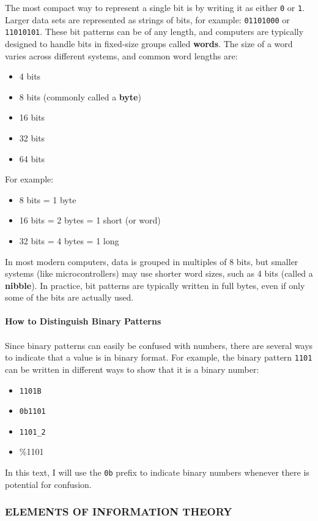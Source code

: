 \documentclass[12pt, oneside]{book}
\begin{document}
The most compact way to represent a single bit is by writing it as either \texttt{0} or \texttt{1}. Larger data sets are represented as strings of bits, for example: \texttt{01101000} or \texttt{11010101}. These bit patterns can be of any length, and computers are typically designed to handle bits in fixed-size groups called \textbf{words}. The size of a word varies across different systems, and common word lengths are:
\begin{itemize}
	\item 4 bits
	\item 8 bits (commonly called a \textbf{byte})
	\item 16 bits
	\item 32 bits
	\item 64 bits
\end{itemize}

\noindent For example:
\begin{itemize}
	\item 8 bits = 1 byte
	\item 16 bits = 2 bytes = 1 short (or word)
	\item 32 bits = 4 bytes = 1 long
\end{itemize}
In most modern computers, data is grouped in multiples of 8 bits, but smaller systems (like microcontrollers) may use shorter word sizes, such as 4 bits (called a \textbf{nibble}). In practice, bit patterns are typically written in full bytes, even if only some of the bits are actually used.\\\\
\textbf{How to Distinguish Binary Patterns}\\\\
Since binary patterns can easily be confused with numbers, there are several ways to indicate that a value is in binary format. For example, the binary pattern \texttt{1101} can be written in different ways to show that it is a binary number:
\begin{itemize}
	\item \texttt{1101B}
	\item \texttt{0b1101}
	\item \texttt{1101\_2}
	\item \%1101
\end{itemize}

In this text, I will use the \texttt{0b} prefix to indicate binary numbers whenever there is potential for confusion.


\subsubsection{ELEMENTS OF	INFORMATION THEORY}
\end{document}
